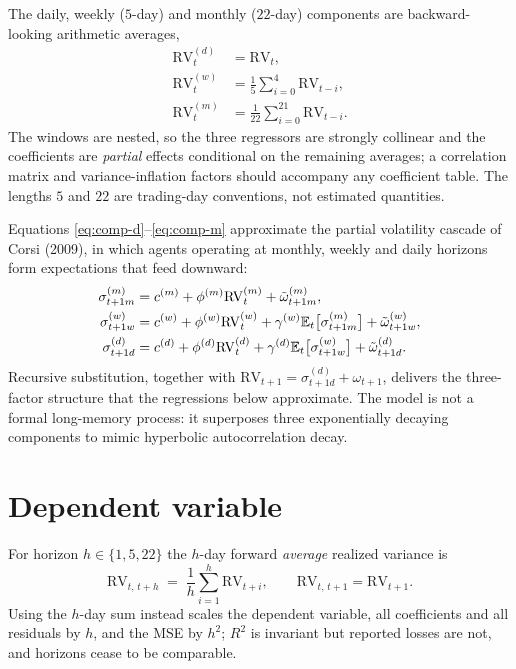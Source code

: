 \documentclass[11pt,a4paper]{article}
\newcommand{\RV}{\mathrm{RV}}
\newcommand{\E}{\mathbb{E}}
\begin{document}
The daily, weekly ($5$-day) and monthly ($22$-day) components are backward-looking
arithmetic averages,
\begin{align}
  \RV^{(d)}_t &= \RV_t, \label{eq:comp-d}\\[2pt]
  \RV^{(w)}_t &= \frac{1}{5}\sum_{i=0}^{4}\RV_{t-i}, \label{eq:comp-w}\\[2pt]
  \RV^{(m)}_t &= \frac{1}{22}\sum_{i=0}^{21}\RV_{t-i}. \label{eq:comp-m}
\end{align}
The windows are nested, so the three regressors are strongly collinear and the coefficients
are \emph{partial} effects conditional on the remaining averages; a correlation matrix and
variance-inflation factors should accompany any coefficient table. The lengths $5$ and $22$
are trading-day conventions, not estimated quantities.

Equations \eqref{eq:comp-d}--\eqref{eq:comp-m} approximate the partial volatility cascade of
Corsi (2009), in which agents operating at monthly, weekly and daily horizons form
expectations that feed downward:
\begin{align}
  \sigma^{(m)}_{t+1m} &= c^{(m)}+\phi^{(m)}\RV^{(m)}_{t}+\tilde\omega^{(m)}_{t+1m},\notag\\
  \sigma^{(w)}_{t+1w} &= c^{(w)}+\phi^{(w)}\RV^{(w)}_{t}
                         +\gamma^{(w)}\E_t\bigl[\sigma^{(m)}_{t+1m}\bigr]+\tilde\omega^{(w)}_{t+1w},
                         \label{eq:cascade}\\
  \sigma^{(d)}_{t+1d} &= c^{(d)}+\phi^{(d)}\RV^{(d)}_{t}
                         +\gamma^{(d)}\E_t\bigl[\sigma^{(w)}_{t+1w}\bigr]+\tilde\omega^{(d)}_{t+1d}.\notag
\end{align}
Recursive substitution, together with $\RV_{t+1}=\sigma^{(d)}_{t+1d}+\omega_{t+1}$, delivers
the three-factor structure that the regressions below approximate. The model is not a formal
long-memory process: it superposes three exponentially decaying components to mimic
hyperbolic autocorrelation decay.

\section{Dependent variable}
\label{sec:target}

For horizon $h\in\{1,5,22\}$ the $h$-day forward \emph{average} realized variance is
\begin{equation}
  \RV_{t,\,t+h} \;=\; \frac{1}{h}\sum_{i=1}^{h}\RV_{t+i},
  \qquad \RV_{t,\,t+1}=\RV_{t+1}.
  \label{eq:target}
\end{equation}
Using the $h$-day sum instead scales the dependent variable, all coefficients and all
residuals by $h$, and the MSE by $h^{2}$; $R^{2}$ is invariant but reported losses are not,
and horizons cease to be comparable.
\end{document}

